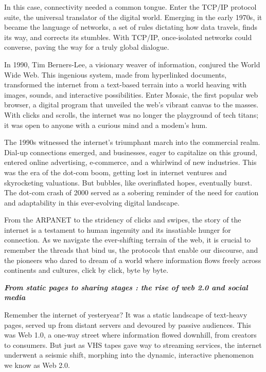 \documentclass[
  letterpaper,
  DIV=11,
  numbers=noendperiod]{scrreprt}
\begin{document}
In this case, connectivity needed a common tongue. Enter the TCP/IP
protocol suite, the universal translator of the digital world. Emerging
in the early 1970s, it became the language of networks, a set of rules
dictating how data travels, finds its way, and corrects its stumbles.
With TCP/IP, once-isolated networks could converse, paving the way for a
truly global dialogue.

In 1990, Tim Berners-Lee, a visionary weaver of information, conjured
the World Wide Web. This ingenious system, made from hyperlinked
documents, transformed the internet from a text-based terrain into a
world heaving with images, sounds, and interactive possibilities. Enter
Mosaic, the first popular web browser, a digital program that unveiled
the web's vibrant canvas to the masses. With clicks and scrolls, the
internet was no longer the playground of tech titans; it was open to
anyone with a curious mind and a modem's hum.

The 1990s witnessed the internet's triumphant march into the commercial
realm. Dial-up connections emerged, and businesses, eager to capitalize
on this ground, entered online advertising, e-commerce, and a whirlwind
of new industries. This was the era of the dot-com boom, getting lost in
internet ventures and skyrocketing valuations. But bubbles, like
overinflated hopes, eventually burst. The dot-com crash of 2000 served
as a sobering reminder of the need for caution and adaptability in this
ever-evolving digital landscape.

From the ARPANET to the stridency of clicks and swipes, the story of the
internet is a testament to human ingenuity and its insatiable hunger for
connection. As we navigate the ever-shifting terrain of the web, it is
crucial to remember the threads that bind us, the protocols that enable
our discourse, and the pioneers who dared to dream of a world where
information flows freely across continents and cultures, click by click,
byte by byte.

\textbf{\emph{From static pages to sharing stages : the rise of web 2.0
and social media}}

Remember the internet of yesteryear? It was a static landscape of
text-heavy pages, served up from distant servers and devoured by passive
audiences. This was Web 1.0, a one-way street where information flowed
downhill, from creators to consumers. But just as VHS tapes gave way to
streaming services, the internet underwent a seismic shift, morphing
into the dynamic, interactive phenomenon we know as Web 2.0.
\end{document}
